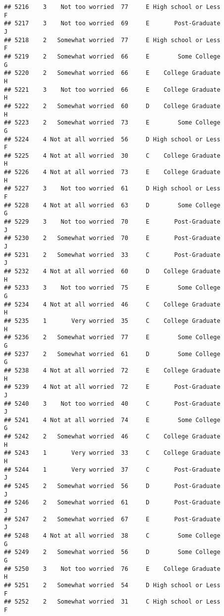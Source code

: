 \documentclass[
]{article}
\begin{document}
\begin{verbatim}
## 5216    3    Not too worried  77     E High school or Less         F
## 5217    3    Not too worried  69     E       Post-Graduate         J
## 5218    2   Somewhat worried  77     E High school or Less         F
## 5219    2   Somewhat worried  66     E        Some College         G
## 5220    2   Somewhat worried  66     E    College Graduate         H
## 5221    3    Not too worried  66     E    College Graduate         H
## 5222    2   Somewhat worried  60     D    College Graduate         H
## 5223    2   Somewhat worried  73     E        Some College         G
## 5224    4 Not at all worried  56     D High school or Less         F
## 5225    4 Not at all worried  30     C    College Graduate         H
## 5226    4 Not at all worried  73     E    College Graduate         H
## 5227    3    Not too worried  61     D High school or Less         F
## 5228    4 Not at all worried  63     D        Some College         G
## 5229    3    Not too worried  70     E       Post-Graduate         J
## 5230    2   Somewhat worried  70     E       Post-Graduate         J
## 5231    2   Somewhat worried  33     C       Post-Graduate         J
## 5232    4 Not at all worried  60     D    College Graduate         H
## 5233    3    Not too worried  75     E        Some College         G
## 5234    4 Not at all worried  46     C    College Graduate         H
## 5235    1       Very worried  35     C    College Graduate         H
## 5236    2   Somewhat worried  77     E        Some College         G
## 5237    2   Somewhat worried  61     D        Some College         G
## 5238    4 Not at all worried  72     E    College Graduate         H
## 5239    4 Not at all worried  72     E       Post-Graduate         J
## 5240    3    Not too worried  40     C       Post-Graduate         J
## 5241    4 Not at all worried  74     E        Some College         G
## 5242    2   Somewhat worried  46     C    College Graduate         H
## 5243    1       Very worried  33     C    College Graduate         H
## 5244    1       Very worried  37     C       Post-Graduate         J
## 5245    2   Somewhat worried  56     D       Post-Graduate         J
## 5246    2   Somewhat worried  61     D       Post-Graduate         J
## 5247    2   Somewhat worried  67     E       Post-Graduate         J
## 5248    4 Not at all worried  38     C        Some College         G
## 5249    2   Somewhat worried  56     D        Some College         G
## 5250    3    Not too worried  76     E    College Graduate         H
## 5251    2   Somewhat worried  54     D High school or Less         F
## 5252    2   Somewhat worried  31     C High school or Less         F

\end{verbatim}
\end{document}
